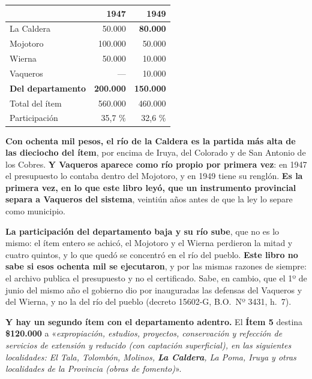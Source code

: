 \begin{center}
\small
\begin{tabular}{lrr}
\toprule
 & \textbf{1947} & \textbf{1949} \\
\midrule
La Caldera              & 50.000  & \textbf{80.000} \\
Mojotoro                & 100.000 & 50.000 \\
Wierna                  & 50.000  & 10.000 \\
Vaqueros                & ---     & 10.000 \\
\midrule
\textbf{Del departamento} & \textbf{200.000} & \textbf{150.000} \\
Total del ítem          & 560.000 & 460.000 \\
Participación           & 35,7 \% & 32,6 \% \\
\bottomrule
\end{tabular}
\end{center}

\begin{cautela}
\textbf{Con ochenta mil pesos, el río de la Caldera es la partida más alta de las dieciocho del
ítem}, por encima de Iruya, del Colorado y de San Antonio de los Cobres. \textbf{Y Vaqueros
aparece como río propio por primera vez}: en 1947 el presupuesto lo contaba dentro del
Mojotoro, y en 1949 tiene su renglón. \textbf{Es la primera vez, en lo que este libro leyó, que un instrumento provincial
separa a Vaqueros del sistema}, veintiún años antes de que la ley lo separe como municipio.

\textbf{La participación del departamento baja y su río sube}, que no es lo mismo: el ítem
entero se achicó, el Mojotoro y el Wierna perdieron la mitad y cuatro quintos, y lo que quedó
se concentró en el río del pueblo. \textbf{Este libro no sabe si esos ochenta mil se
ejecutaron}, y por las mismas razones de siempre: el archivo publica el presupuesto y no el
certificado. Sabe, en cambio, que el 1º de junio del mismo año el gobierno dio por inauguradas las
defensas del Vaqueros y del Wierna, y no la del río del pueblo (decreto 15602-G, B.O.\ Nº 3431, h.\ 7).

\textbf{Y hay un segundo ítem con el departamento adentro.} El \textbf{Ítem 5} destina
\textbf{\$120.000} a «\textit{expropiación, estudios, proyectos, conservación y refección de
servicios de extensión y reducido (con captación superficial), en las siguientes localidades:
El Tala, Tolombón, Molinos, \textbf{La Caldera}, La Poma, Iruya y otras localidades de la
Provincia (obras de fomento)}».
\end{cautela}

